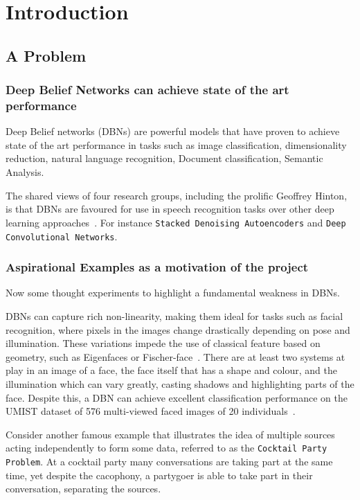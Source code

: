 \chapter{Introduction}

\section{A Problem}
\subsection{Deep Belief Networks can achieve state of the art performance}
Deep Belief networks (DBNs) are powerful models that have proven to achieve state of the art performance in tasks such as image classification, dimensionality reduction, natural language recognition, Document classification, Semantic Analysis.

The shared views of four research groups, including the prolific Geoffrey Hinton, is that DBNs are favoured for use in speech recognition tasks over other deep learning approaches~\cite{Hinton:38131ww}. For instance \texttt{Stacked Denoising Autoencoders} and \texttt{Deep Convolutional Networks}.


\subsection{Aspirational Examples as a motivation of the project}

Now some thought experiments to highlight a fundamental weakness in DBNs.

DBNs can capture rich non-linearity, making them ideal for tasks such as facial recognition, where pixels in the images change drastically depending on pose and illumination. These variations impede the use of classical feature based on geometry, such as Eigenfaces or Fischer-face~\cite{Lin:6100469ww}. There are at least two systems at play in an image of a face, the face itself that has a shape and colour, and the illumination which can vary greatly, casting shadows and highlighting parts of the face. Despite this, a DBN can achieve excellent classification performance on the UMIST dataset of 576 multi-viewed faced images of 20 individuals~\cite{Lin:6100469ww}.

Consider another famous example that illustrates the idea of multiple sources acting independently to form some data, referred to as the \texttt{Cocktail Party Problem}. At a cocktail party many conversations are taking part at the same time, yet despite the cacophony, a partygoer is able to take part in their conversation, separating the sources.

